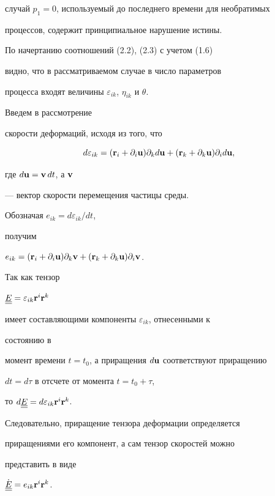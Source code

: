 случай $p_1=0$, используемый до последнего времени для необратимых


процессов, содержит принципиальное нарушение истины.


По начертанию соотношений (2.2), (2.3) с учетом (1.6)


видно, что в рассматриваемом случае в число параметров


процесса входят величины $\varepsilon_{ik}$, $\eta_{ik}$ и $\theta$.


Введем в рассмотрение


скорости деформаций, исходя из того, что


$$


d\varepsilon_{ik}=({\bold r}_i+\partial_i{\bold u})\partial_k d{\bold u}+


({\bold r}_k+\partial_k{\bold u})\partial_i d{\bold u},


$$


где $d{\bold u}={\bold v}\,dt$, а ${\bold v}$


--- вектор скорости перемещения частицы среды.


Обозначая $e_{ik}=d\varepsilon_{ik}/dt$,


получим


$e_{ik}=({\bold r}_i+\partial_i{\bold u})\partial_k{\bold v}


+({\bold r}_k+\partial_k{\bold u})


\partial_i{\bold v}$.


Так как тензор


$\underline{\underline E}=\varepsilon_{ik}{\bold r}^i{\bold r}^k$


имеет составляющими компоненты $\varepsilon_{ik}$, отнесенными к


состоянию в


момент времени $t=t_0$, а приращения $d\bold u$ соответствуют приращению


$dt=d\tau$ в отсчете от момента $t=t_0+\tau$,


то $d \underline{\underline E}=d\varepsilon_{ik}{\bold r}^i{\bold r}^k$.


Следовательно, приращение тензора деформации определяется


приращениями его компонент, а сам тензор скоростей можно


представить в виде


$\Dot{\underline{\underline E}}=e_{ik}{\bold r}^i{\bold r}^k$.


\medskip





